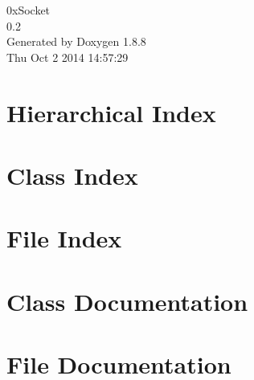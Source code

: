 \documentclass[twoside]{book}
\newcommand{\+}{\discretionary{\mbox{\scriptsize$\hookleftarrow$}}{}{}}
\newcommand{\clearemptydoublepage}{%
  \newpage{\pagestyle{empty}\cleardoublepage}%
}
\begin{document}
\hypersetup{pageanchor=false,
             bookmarks=true,
             bookmarksnumbered=true,
             pdfencoding=unicode
            }
\begin{titlepage}
\vspace*{7cm}
\begin{center}%
{\Large 0x\+Socket \\[1ex]\large 0.\+2 }\\
\vspace*{1cm}
{\large Generated by Doxygen 1.8.8}\\
\vspace*{0.5cm}
{\small Thu Oct 2 2014 14:57:29}\\
\end{center}
\end{titlepage}
\clearemptydoublepage
\tableofcontents
\clearemptydoublepage
{}
\hypersetup{pageanchor=true}

\chapter{Hierarchical Index}

\chapter{Class Index}

\chapter{File Index}

\chapter{Class Documentation}












\chapter{File Documentation}



























\newpage
{}
{}
\printindex
\end{document}
